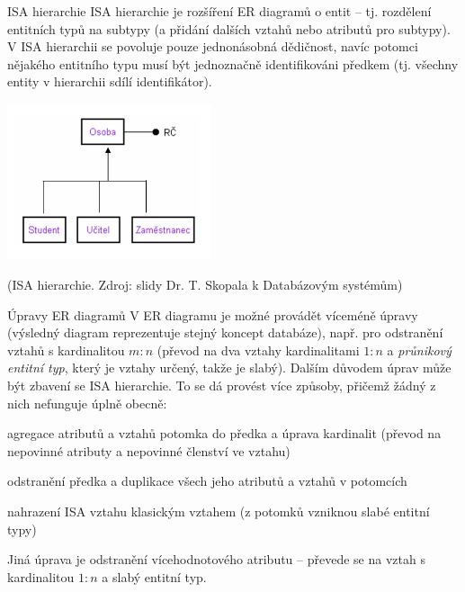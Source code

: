 \begin{obecne}{ISA hierarchie}
ISA hierarchie je rozšíření ER diagramů o  entit -- tj. rozdělení entitních typů na subtypy (a přidání dalších vztahů nebo atributů pro subtypy). V ISA hierarchii se povoluje pouze jednonásobná dědičnost, navíc potomci nějakého entitního typu musí být jednoznačně identifikováni předkem (tj. všechny entity v hierarchii sdílí identifikátor).

\begin{center}
\includegraphics[width=6cm]{informatika/databazy/obrazky/er4.png}

(ISA hierarchie. Zdroj: slidy Dr. T. Skopala k Databázovým systémům)
\end{center}
\end{obecne}

\begin{obecne}{Úpravy ER diagramů}
V ER diagramu je možné provádět víceméně  úpravy (výsledný diagram reprezentuje stejný koncept databáze), např. pro odstranění vztahů s kardinalitou $m:n$ (převod na dva vztahy kardinalitami $1:n$ a \emph{průnikový entitní typ}, který je vztahy určený, takže je slabý). Dalším důvodem úprav může být zbavení se ISA hierarchie. To se dá provést více způsoby, přičemž žádný z nich nefunguje úplně obecně:
\begin{pitemize}
    \item agregace atributů a vztahů potomka do předka a úprava kardinalit (převod na nepovinné atributy a nepovinné členství ve vztahu)
    \item odstranění předka a duplikace všech jeho atributů a vztahů v potomcích
    \item nahrazení ISA vztahu klasickým vztahem (z potomků vzniknou slabé entitní typy)
\end{pitemize}
Jiná úprava je odstranění vícehodnotového atributu -- převede se na vztah s kardinalitou $1:n$ a slabý entitní typ.
\end{obecne}

